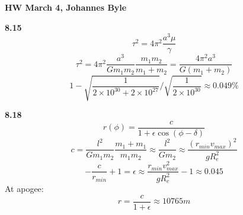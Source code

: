 \documentclass[english]{article}
\begin{document}
\begin{multicols*}{2}
\textbf{HW March 4, Johannes Byle}\\
\newcommand{\Lagr}{\mathcal{L}}

\noindent
\textbf{8.15}
$$\tau^2=4\pi^2\frac{a^3\mu}{\gamma}$$
$$\tau^2=4\pi^2\frac{a^3}{Gm_1m_2}\frac{m_1m_2}{m_1+m_2}=\frac{4\pi^2a^3}{G(m_1+m_2)}$$
$$1-\sqrt{\frac{1}{2\times10^{30}+2\times10^{27}}}/\sqrt{\frac{1}{2\times10^{30}}}\approx0.049\%$$

\noindent
\textbf{8.18}
$$r(\phi)=\frac{c}{1+\epsilon\cos(\phi-\delta)}$$
$$c=\frac{l^2}{Gm_1m_2}\frac{m_1+m_1}{m_1m_2}\approx\frac{l^2}{Gm_2}\approx\frac{(r_{min}v_{max})^2}{gR_e^2}$$
$$-\frac{c}{r_{min}}+1=\epsilon\approx\frac{r_{min}v_{max}^2}{gR_e^2}-1\approx0.045$$
At apogee:
$$r=\frac{c}{1+\epsilon}\approx10765m$$
\end{multicols*}
\end{document}
